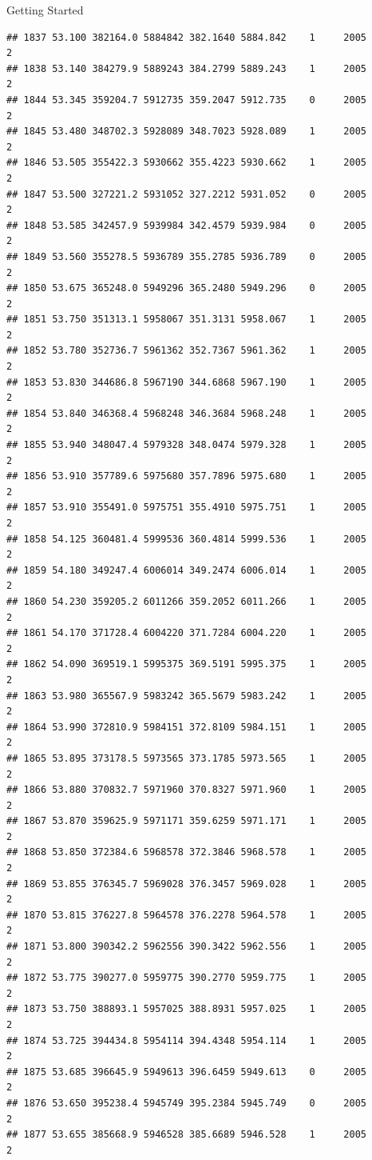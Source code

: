 \documentclass[
  ignorenonframetext,
]{beamer}
\begin{document}
\begin{frame}[fragile]{Getting Started}
\begin{verbatim}
## 1837 53.100 382164.0 5884842 382.1640 5884.842    1     2005        2
## 1838 53.140 384279.9 5889243 384.2799 5889.243    1     2005        2
## 1844 53.345 359204.7 5912735 359.2047 5912.735    0     2005        2
## 1845 53.480 348702.3 5928089 348.7023 5928.089    1     2005        2
## 1846 53.505 355422.3 5930662 355.4223 5930.662    1     2005        2
## 1847 53.500 327221.2 5931052 327.2212 5931.052    0     2005        2
## 1848 53.585 342457.9 5939984 342.4579 5939.984    0     2005        2
## 1849 53.560 355278.5 5936789 355.2785 5936.789    0     2005        2
## 1850 53.675 365248.0 5949296 365.2480 5949.296    0     2005        2
## 1851 53.750 351313.1 5958067 351.3131 5958.067    1     2005        2
## 1852 53.780 352736.7 5961362 352.7367 5961.362    1     2005        2
## 1853 53.830 344686.8 5967190 344.6868 5967.190    1     2005        2
## 1854 53.840 346368.4 5968248 346.3684 5968.248    1     2005        2
## 1855 53.940 348047.4 5979328 348.0474 5979.328    1     2005        2
## 1856 53.910 357789.6 5975680 357.7896 5975.680    1     2005        2
## 1857 53.910 355491.0 5975751 355.4910 5975.751    1     2005        2
## 1858 54.125 360481.4 5999536 360.4814 5999.536    1     2005        2
## 1859 54.180 349247.4 6006014 349.2474 6006.014    1     2005        2
## 1860 54.230 359205.2 6011266 359.2052 6011.266    1     2005        2
## 1861 54.170 371728.4 6004220 371.7284 6004.220    1     2005        2
## 1862 54.090 369519.1 5995375 369.5191 5995.375    1     2005        2
## 1863 53.980 365567.9 5983242 365.5679 5983.242    1     2005        2
## 1864 53.990 372810.9 5984151 372.8109 5984.151    1     2005        2
## 1865 53.895 373178.5 5973565 373.1785 5973.565    1     2005        2
## 1866 53.880 370832.7 5971960 370.8327 5971.960    1     2005        2
## 1867 53.870 359625.9 5971171 359.6259 5971.171    1     2005        2
## 1868 53.850 372384.6 5968578 372.3846 5968.578    1     2005        2
## 1869 53.855 376345.7 5969028 376.3457 5969.028    1     2005        2
## 1870 53.815 376227.8 5964578 376.2278 5964.578    1     2005        2
## 1871 53.800 390342.2 5962556 390.3422 5962.556    1     2005        2
## 1872 53.775 390277.0 5959775 390.2770 5959.775    1     2005        2
## 1873 53.750 388893.1 5957025 388.8931 5957.025    1     2005        2
## 1874 53.725 394434.8 5954114 394.4348 5954.114    1     2005        2
## 1875 53.685 396645.9 5949613 396.6459 5949.613    0     2005        2
## 1876 53.650 395238.4 5945749 395.2384 5945.749    0     2005        2
## 1877 53.655 385668.9 5946528 385.6689 5946.528    1     2005        2

\end{verbatim}
\end{frame}
\end{document}
